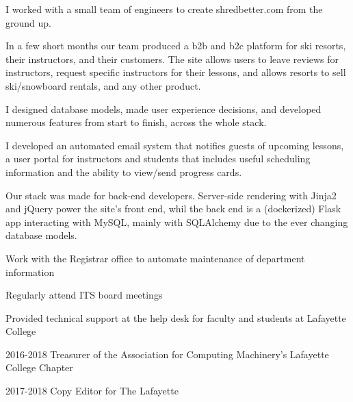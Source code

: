 \documentclass[letterpaper]{deedy-resume} %
\begin{document}
\begin{minipage}[t]{0.64\textwidth}
I worked with a small team of engineers to create shredbetter.com from the ground up.
\sectionspace
\begin{tightitemize}
\item In a few short months our team produced a b2b and b2c platform for ski resorts, their instructors, and their customers. The site allows users to leave reviews for instructors, request specific instructors for their lessons, and allows resorts to sell ski/snowboard rentals, and any other product.
\item I designed database models, made user experience decisions, and developed numerous features from start to finish, across the whole stack. 
\item I developed an automated email system that notifies guests of upcoming lessons, a user portal for instructors and students that includes useful scheduling information and the ability to view/send progress cards.
\item Our stack was made for back-end developers. Server-side rendering with Jinja2 and jQuery power the site's front end, whil the back end is a (dockerized) Flask app interacting with MySQL, mainly with SQLAlchemy due to the ever changing database models.
\end{tightitemize}


\begin{tightitemize}
\item Work with the Registrar office to automate maintenance of department information
\item Regularly attend ITS board meetings
\item Provided technical support at the help desk for faculty and students at Lafayette College
\end{tightitemize}

\sectionspace

\sectionspace %



\sectionspace %



\begin{tightitemize}
\item 2016-2018 Treasurer of the Association for Computing Machinery's 
Lafayette College Chapter \\
\item 2017-2018 Copy Editor for The Lafayette 
\end{tightitemize}

\sectionspace
\end{minipage} %
\end{document}

